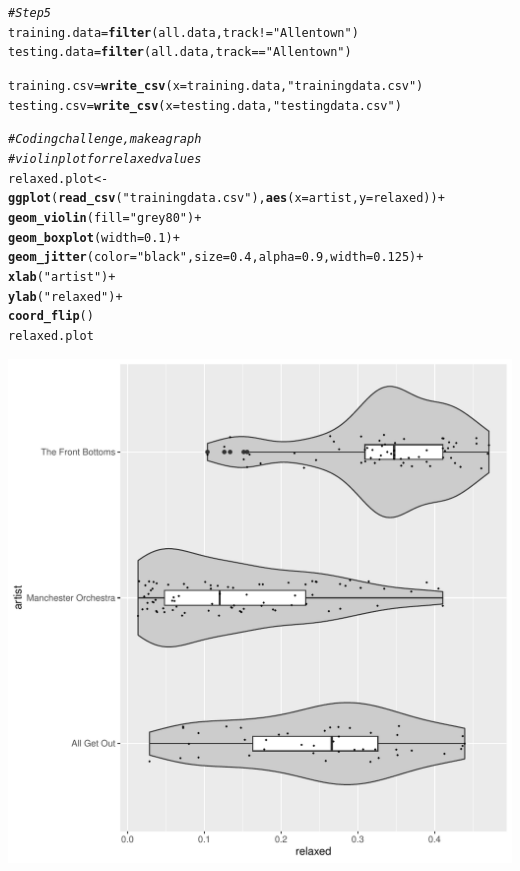 \documentclass{article}\usepackage[]{graphicx}\usepackage[]{xcolor}
\makeatletter
\def\maxwidth{ %
  \ifdim\Gin@nat@width>\linewidth
    \linewidth
  \else
    \Gin@nat@width
  \fi
}
\newcommand{\hlnum}[1]{\textcolor[rgb]{0.686,0.059,0.569}{#1}}%
\newcommand{\hlsng}[1]{\textcolor[rgb]{0.192,0.494,0.8}{#1}}%
\newcommand{\hlcom}[1]{\textcolor[rgb]{0.678,0.584,0.686}{\textit{#1}}}%
\newcommand{\hlopt}[1]{\textcolor[rgb]{0,0,0}{#1}}%
\newcommand{\hldef}[1]{\textcolor[rgb]{0.345,0.345,0.345}{#1}}%
\newcommand{\hlkwb}[1]{\textcolor[rgb]{0.69,0.353,0.396}{#1}}%
\newcommand{\hlkwc}[1]{\textcolor[rgb]{0.333,0.667,0.333}{#1}}%
\newcommand{\hlkwd}[1]{\textcolor[rgb]{0.737,0.353,0.396}{\textbf{#1}}}%
\newenvironment{kframe}{%
 \def\at@end@of@kframe{}%
 \ifinner\ifhmode%
  \def\at@end@of@kframe{\end{minipage}}%
  \begin{minipage}{\columnwidth}%
 \fi\fi%
 \def\FrameCommand##1{\hskip\@totalleftmargin \hskip-\fboxsep
 \colorbox{shadecolor}{##1}\hskip-\fboxsep
     \hskip-\linewidth \hskip-\@totalleftmargin \hskip\columnwidth}%
 \MakeFramed {\advance\hsize-\width
   \@totalleftmargin\z@ \linewidth\hsize
   \@setminipage}}%
 {\par\unskip\endMakeFramed%
 \at@end@of@kframe}
\newenvironment{knitrout}{}{} %
\makeatother
\begin{document}
\begin{enumerate}
\begin{knitrout}
\begin{kframe}
\begin{alltt}
\hlcom{#Step 5}
\hldef{training.data} \hlkwb{=} \hlkwd{filter}\hldef{(all.data, track} \hlopt{!=} \hlsng{"Allentown"}\hldef{)}
\hldef{testing.data} \hlkwb{=} \hlkwd{filter}\hldef{(all.data, track} \hlopt{==} \hlsng{"Allentown"}\hldef{)}

\hldef{training.csv} \hlkwb{=} \hlkwd{write_csv}\hldef{(}\hlkwc{x}\hldef{=training.data,} \hlsng{"trainingdata.csv"}\hldef{)}
\hldef{testing.csv} \hlkwb{=} \hlkwd{write_csv}\hldef{(}\hlkwc{x}\hldef{=testing.data,} \hlsng{"testingdata.csv"}\hldef{)}


\hlcom{# Coding challenge, make a graph }
\hlcom{# violin plot for relaxed values}
\hldef{relaxed.plot} \hlkwb{<-} \hlkwd{ggplot}\hldef{(}\hlkwd{read_csv}\hldef{(}\hlsng{"trainingdata.csv"}\hldef{),} \hlkwd{aes}\hldef{(}\hlkwc{x}\hldef{=artist,} \hlkwc{y}\hldef{=relaxed))}\hlopt{+}
  \hlkwd{geom_violin}\hldef{(}\hlkwc{fill}\hldef{=}\hlsng{"grey80"}\hldef{)}\hlopt{+}
  \hlkwd{geom_boxplot}\hldef{(}\hlkwc{width} \hldef{=} \hlnum{0.1}\hldef{)}\hlopt{+}
  \hlkwd{geom_jitter}\hldef{(}\hlkwc{color} \hldef{=} \hlsng{"black"}\hldef{,} \hlkwc{size} \hldef{=} \hlnum{0.4}\hldef{,} \hlkwc{alpha} \hldef{=} \hlnum{0.9}\hldef{,} \hlkwc{width} \hldef{=} \hlnum{0.125}\hldef{)}\hlopt{+}
  \hlkwd{xlab}\hldef{(}\hlsng{"artist"}\hldef{)}\hlopt{+}
  \hlkwd{ylab}\hldef{(}\hlsng{"relaxed"}\hldef{)}\hlopt{+}
  \hlkwd{coord_flip}\hldef{()}
\hldef{relaxed.plot}
\end{alltt}
\end{kframe}
\includegraphics[width=\maxwidth]{figure/unnamed-chunk-1-1} 
\end{knitrout}
\end{enumerate}

\end{document}
